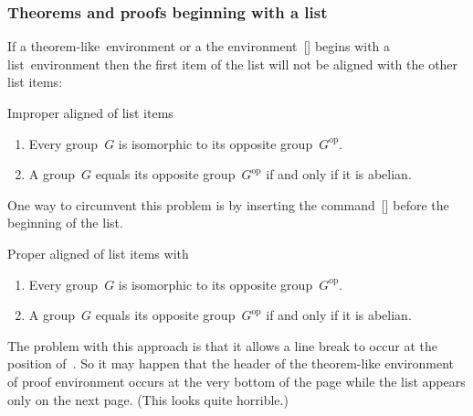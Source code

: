 \subsubsection{Theorems and proofs beginning with a list}

If a theorem-like~environment or a the environment~[\envname] begins with a list~environment then the first item of the list will not be aligned with the other list items:
\begin{showlatex}{Improper aligned of list items}
\begin{lemma}
\begin{enumerate}
  \item
    Every group~$G$ is isomorphic to its opposite group~$G^{\mathrm{op}}$.
  \item
    A group~$G$ equals its opposite group~$G^{\mathrm{op}}$ if and only if it is abelian.
\end{enumerate}
\end{lemma}
\end{showlatex}

One way to circumvent this problem is by inserting the command~[\comname] before the beginning of the list.
\begin{showlatex}{Proper aligned of list items with~}
\begin{lemma}
\leavevmode
\begin{enumerate}
  \item
    Every group~$G$ is isomorphic to its opposite group~$G^{\mathrm{op}}$.
  \item
    A group~$G$ equals its opposite group~$G^{\mathrm{op}}$ if and only if it is abelian.
\end{enumerate}
\end{lemma}
\end{showlatex}
The problem with this approach is that it allows a line break to occur at the position of~.
So it may happen that the header of the theorem-like environment of proof environment occurs at the very bottom of the page while the list appears only on the next page.
(This looks quite horrible.)

